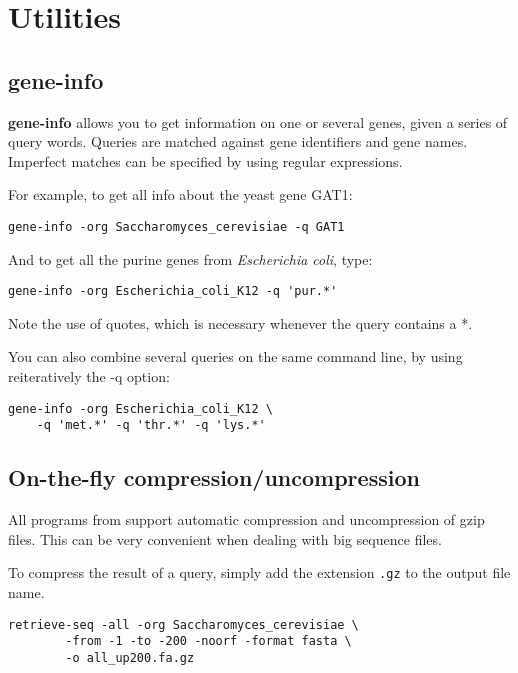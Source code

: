 \section{Utilities}

\subsection{gene-info}

\textbf{gene-info} allows you to get information on one or 
several genes, given a series of query words. Queries are matched
against gene identifiers and gene names. Imperfect matches can be
specified by using regular expressions.

For example, to get all info about the yeast gene GAT1:

\begin{verbatim}
gene-info -org Saccharomyces_cerevisiae -q GAT1
\end{verbatim}

And to get all the purine genes from \textit{Escherichia coli}, type: 

\begin{verbatim}
gene-info -org Escherichia_coli_K12 -q 'pur.*'
\end{verbatim}

Note the use of quotes, which is necessary whenever the query contains
a *.

You can also combine several queries on the same command line, by
using reiteratively the -q option:

\begin{verbatim}
gene-info -org Escherichia_coli_K12 \
    -q 'met.*' -q 'thr.*' -q 'lys.*'
\end{verbatim}

\subsection{On-the-fly compression/uncompression}
All programs from \RSAT support automatic compression and
uncompression of gzip files. This can be very convenient when dealing
with big sequence files.

To compress the result of a query, simply add the extension
\texttt{.gz} to the output file name.

\begin{verbatim}
retrieve-seq -all -org Saccharomyces_cerevisiae \
        -from -1 -to -200 -noorf -format fasta \
        -o all_up200.fa.gz
\end{verbatim}

